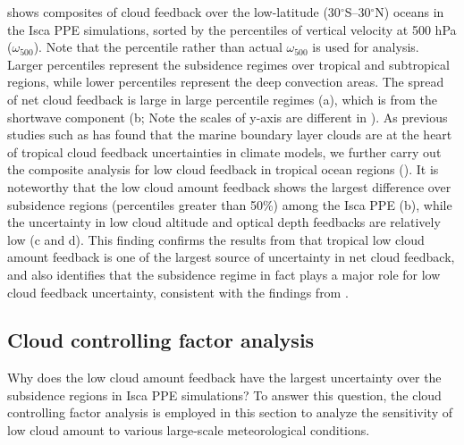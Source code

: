  shows composites of cloud feedback over the low-latitude (30$^\circ$S--30$^\circ$N) oceans in the Isca PPE simulations, sorted by the percentiles of vertical velocity at 500 hPa ($\omega_{500}$). Note that the percentile rather than actual $\omega_{500}$ is used for analysis. Larger percentiles represent the subsidence regimes over tropical and subtropical regions, while lower percentiles represent the deep convection areas. The spread of net cloud feedback is large in large percentile regimes (a), which is from the shortwave component (b; Note the scales of y-axis are different in ). As previous studies such as \cite{Bony2005} has found that the marine boundary layer clouds are at the heart of tropical cloud feedback uncertainties in climate models, we further carry out the composite analysis for low cloud feedback in tropical ocean regions (). It is noteworthy that the low cloud amount feedback shows the largest difference  over subsidence regions (percentiles greater than 50\%) among the Isca PPE (b), while the uncertainty in low cloud altitude and optical depth feedbacks are relatively low (c and d). This finding confirms the results from  that tropical low cloud amount feedback is one of the largest source of uncertainty in net cloud feedback, and also identifies that the subsidence regime in fact plays a major role for low cloud feedback uncertainty, consistent with the findings from \cite{Bony2005}.

\subsection{Cloud controlling factor analysis}
\label{sec:cld_control_factor}

Why does the low cloud amount feedback have the largest uncertainty over the subsidence regions in Isca PPE simulations? To answer this question, the cloud controlling factor analysis \citep[e.g.,][]{Qu2015positive,Myers2016,McCoy2017change,Klein2017low,Scott2020,Myers2021,Cesana2021,Ceppi2021observational} is employed in this section to analyze the sensitivity of low cloud amount to various large-scale meteorological conditions. 


